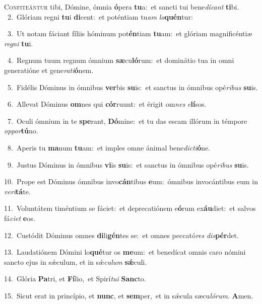 \lettrine{\initial\textcolor{\initialcolor}{C}}{onfiteántur} tibi, Dómine, ómnia \textbf{ó}\-pera \textbf{tu}\-a:~\star et sancti tui bene\-\textit{dí}\-\textit{cant} \textbf{ti}\-bi.\\
{\numbfont\textcolor{\numbcolor}{~2.}}~Glóriam regni \textbf{tu}\-i \textbf{di}\-cent:~\star et poténtiam tu\textit{am} \textit{lo}\-\textbf{quén}tur:\par
{\numbfont\textcolor{\numbcolor}{~3.}}~Ut notam fáciant fíliis hóminum pot\-\textbf{én}\-tiam \textbf{tu}\-am:~\star et glóriam magnificéntiæ \textit{re}\-\textit{gni} \textbf{tu}\-i.\par
{\numbfont\textcolor{\numbcolor}{~4.}}~Regnum tuum regnum ómnium \textbf{sæ}\-cu\-\textbf{ló}\-rum:~\star et dominátio tua in omni generatióne et gene\-\textit{ra}\-\textit{ti}\textbf{ó}nem.\par
{\numbfont\textcolor{\numbcolor}{~5.}}~Fidélis Dóminus in ómnibus \textbf{ver}\-bis \textbf{su}\-is:~\star et sanctus in ómnibus opé\-\textit{ri}\-\textit{bus} \textbf{su}\-is.\par
{\numbfont\textcolor{\numbcolor}{~6.}}~Allevat Dóminus \textbf{om}\-nes qui \textbf{cór}\-ruunt:~\star et érigit om\textit{nes} \textit{e}\-\textbf{lí}sos.\par
{\numbfont\textcolor{\numbcolor}{~7.}}~Oculi ómnium in te \textbf{spe}\-rant, \textbf{Dó}\-mine:~\star et tu das escam illórum in témpore \textit{op}\-\textit{por}\textbf{tú}no.\par
{\numbfont\textcolor{\numbcolor}{~8.}}~Aperis tu \textbf{ma}\-num \textbf{tu}\-am:~\star et imples omne ánimal bene\-\textit{dic}\-\textit{ti}\textbf{ó}ne.\par
{\numbfont\textcolor{\numbcolor}{~9.}}~Justus Dóminus in ómnibus \textbf{vi}\-is \textbf{su}\-is:~\star et sanctus in ómnibus opé\-\textit{ri}\-\textit{bus} \textbf{su}\-is.\par
{\numbfont\textcolor{\numbcolor}{10.}}~Prope est Dóminus ómnibus invo\-\textbf{cán}\-tibus \textbf{e}\-um:~\star ómnibus invocántibus eum in \textit{ve}\-\textit{ri}\textbf{tá}te.\par
{\numbfont\textcolor{\numbcolor}{11.}}~Voluntátem timéntium se fáciet:~\dagger et deprecatiónem e\-\textbf{ó}\-rum ex\-\textbf{áu}\-diet:~\star et salvos fá\-\textit{ci}\-\textit{et} \textbf{e}\-os.\par
{\numbfont\textcolor{\numbcolor}{12.}}~Custódit Dóminus omnes \textbf{di}\-li\-\textbf{gén}\-tes se:~\star et omnes peccató\textit{res} \textit{dis}\-\textbf{pér}det.\par
{\numbfont\textcolor{\numbcolor}{13.}}~Laudatiónem Dómini lo\-\textbf{qué}\-tur os \textbf{me}\-um:~\star et benedícat omnis caro nómini sancto ejus in sǽculum, et in sǽ\-\textit{cu}\-\textit{lum} \textbf{sǽ}\-culi.\par
{\numbfont\textcolor{\numbcolor}{14.}}~Glória \textbf{Pa}\-tri, et \textbf{Fí}\-lio,~\star et Spirí\-\textit{tu}\-\textit{i} \textbf{Sanc}\-to.\par
{\numbfont\textcolor{\numbcolor}{15.}}~Sicut erat in princípio, et \textbf{nunc}\-, et \textbf{sem}\-per,~\star et in sǽcula sæcu\-\textit{ló}\-\textit{rum}. \textbf{A}\-men.\par
